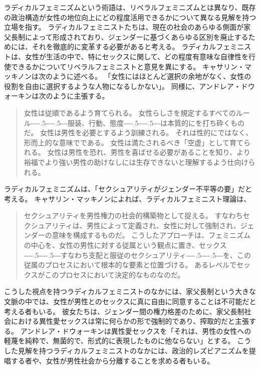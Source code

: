 \documentclass[paper=a4,book,openany]{jlreq}
\newcommand{\ig}[1]{}           %
\def\DDASH{―\kern-.5\zw―\kern-.5\zw―} %
\begin{document}
ラディカルフェミニズムという術語は、リベラルフェミニズムとは異なり、既存の政治構造が女性の地位向上にどの程度活用できるかについて異なる見解を持つ立場を指す。
ラディカルフェミニストたちは、現在の社会のあらゆる側面が家父長制によって形成されており、ジェンダーに基づくあらゆる区別を廃止するためには、それを徹底的に変革する必要があると考える。
ラディカルフェミニストは、女性が生活の中で、特にセックスに関して、どの程度有意味な自律性を行使できるかについてリベラルフェミニストと意見を異にする。
キャサリン・マッキノンは次のように述べる。
「女性にはほとんど選択の余地がなく、女性の役割を自由に選択するような人物になるしかない」\citep[p.124]{mackinnon89:_towar_femin_theor_of_state}。
同様に、アンドレア・ドウォーキンは次のように主張する。
\ig{Andrea Dworkin}

\begin{quote}
  女性は従順であるよう育てられる。
女性らしさを規定するすべてのルール{\DDASH}服装、行動、態度{\DDASH}は本質的にを打ち砕くものだ。
女性は男性を必要とするよう訓練される。
それは性的にではなく、形而上的な意味でである。
女性は満たされるべき「空虚」として育てられる。
女性は男性を恐れ、男性を喜ばせる必要があることを知り、より裕福でより強い男性の助けなしには生存できないと理解するよう仕向けられる。
\citep[p.81]{dworkin83:_righ_wing_women}
\end{quote}

ラディカルフェミニズムは、「セクシュアリティがジェンダー不平等の要」だと考える。
キャサリン・マッキノンによれば、ラディカルフェミニスト理論は、
\begin{quote}
セクシュアリティを男性権力の社会的構築物として捉える。
すなわちセクシュアリティは、男性によって定義され、女性に対して強制され、ジェンダーの意味を構成するものだ。
こうしたアプローチは、フェミニズムの中心を、女性の男性に対する従属という観点に置き、セックス{\DDASH}すなわち支配と服従のセクシュアリティ{\DDASH}を、この従属のプロセスにおいて根本的な要素と位置づける。
あるレベルでセックスがこのプロセスにおいて決定的なものなのだ。
\citep[p.128]{mackinnon89:_towar_femin_theor_of_state}
\end{quote}

こうした視点を持つラディカルフェミニストのなかには、家父長制という大きな文脈の中では、女性が男性とのセックスに真に自由に同意することは不可能だと考える者もいる。
彼女たちは、ジェンダー間の権力格差のために、家父長制社会における異性愛セックスは常に何らかの形で強制的であり、搾取的だと主張する。
アンドレア・ドウォーキンは異性愛セックスを「それは、男性の女性への軽蔑を純粋で、無菌的で、形式的に表現したものに他ならない」とする\citep[p.138]{dworkin87:_inter}。
\ig{Andrea Dworkin}こうした見解を持つラディカルフェミニストのなかには、政治的レズビアニズムを提唱する者や、女性が男性社会から分離することを求める者もいる。
\end{document}
